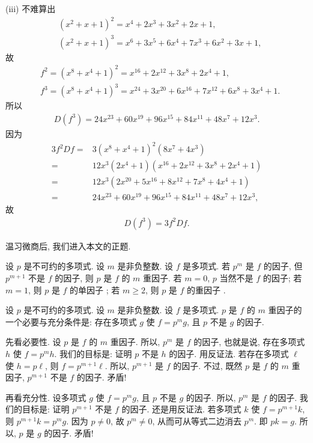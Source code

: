\begin{example}
    (iii) 不难算出
    \begin{align*}
         & (x^2 + x + 1)^2 = x^4+2 x^3+3 x^2+2 x+1,             \\
         & (x^2 + x + 1)^3 = x^6+3 x^5+6 x^4+7 x^3+6 x^2+3 x+1,
    \end{align*}
    故
    \begin{align*}
         & f^2 = (x^8 + x^4 + 1)^2 = x^{16}+2 x^{12}+3 x^8+2 x^4+1,                   \\
         & f^3 = (x^8 + x^4 + 1)^3 = x^{24}+3 x^{20}+6 x^{16}+7 x^{12}+6 x^8+3 x^4+1.
    \end{align*}
    所以
    \begin{align*}
        D(f^3) = 24 x^{23}+60 x^{19}+96 x^{15}+84 x^{11}+48 x^7+12 x^3.
    \end{align*}
    因为
    \begin{align*}
        3f^2 Df
        = {} & 3(x^8 + x^4 + 1)^2 (8x^7 + 4x^3)                       \\
        = {} & 12 x^3 (2x^4 + 1) (x^{16}+2 x^{12}+3 x^8+2 x^4+1)      \\
        = {} & 12 x^3 (2 x^{20}+5 x^{16}+8 x^{12}+7 x^8+4 x^4+1)      \\
        = {} & 24 x^{23}+60 x^{19}+96 x^{15}+84 x^{11}+48 x^7+12 x^3,
    \end{align*}
    故
    \begin{align*}
        D(f^3) = 3f^2 Df.
    \end{align*}
\end{example}

温习微商后, 我们进入本文的正题.

\begin{definition}
    设 $p$ 是不可约的多项式. 设 $m$ 是非负整数. 设 $f$ 是多项式. 若 $p^m$ 是 $f$ 的因子, 但 $p^{m+1}$ 不是 $f$ 的因子, 则 $p$ 是 $f$ 的 $m$ 重因子. 若 $m = 0$, $p$ 当然不是 $f$ 的因子; 若 $m = 1$, 则 $p$ 是 $f$ 的单因子 ; 若 $m \geq 2$, 则 $p$ 是 $f$ 的重因子 .
\end{definition}

\begin{proposition}
    设 $p$ 是不可约的多项式. 设 $m$ 是非负整数. 设 $f$ 是多项式. $p$ 是 $f$ 的 $m$ 重因子的一个必要与充分条件是: 存在多项式 $g$ 使 $f = p^m g$, 且 $p$ 不是 $g$ 的因子.
\end{proposition}

\begin{pf}
    先看必要性. 设 $p$ 是 $f$ 的 $m$ 重因子. 所以, $p^m$ 是 $f$ 的因子, 也就是说, 存在多项式 $h$ 使 $f = p^m h$. 我们的目标是: 证明 $p$ 不是 $h$ 的因子. 用反证法. 若存在多项式 $\ell$ 使 $h = p\ell$, 则 $f = p^{m+1} \ell$. 所以, $p^{m+1}$ 是 $f$ 的因子. 不过, 既然 $p$ 是 $f$ 的 $m$ 重因子, $p^{m+1}$ 不是 $f$ 的因子. 矛盾!

    再看充分性. 设多项式 $g$ 使 $f = p^m g$, 且 $p$ 不是 $g$ 的因子. 所以, $p^m$ 是 $f$ 的因子. 我们的目标是: 证明 $p^{m+1}$ 不是 $f$ 的因子. 还是用反证法. 若多项式 $k$ 使 $f = p^{m+1} k$, 则 $p^{m+1} k = p^m g$. 因为 $p \neq 0$, 故 $p^m \neq 0$, 从而可从等式二边消去 $p^m$. 即 $pk = g$. 所以, $p$ 是 $g$ 的因子. 矛盾!
\end{pf}

